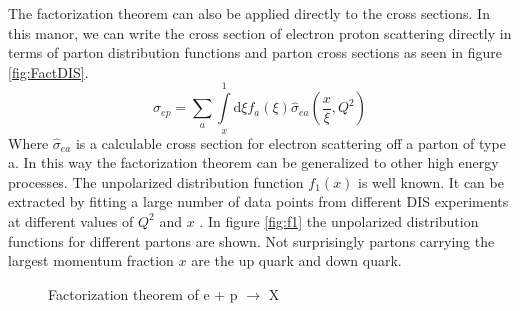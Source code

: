 \documentclass[abstract = on,listof=totoc, bibliography=totoc]{scrreprt}
\begin{document}
The factorization theorem can also be applied directly to the cross sections. In this manor, we can write the cross section of electron proton scattering directly in terms of parton distribution functions and parton cross sections as seen in figure \ref{fig:FactDIS}.
\begin{equation}
\sigma_{ep} = \sum\limits_a \int\limits_x^1 \text{d}\xi f_a(\xi) \hat{\sigma}_{ea}\left(\frac{x}{\xi},Q^2\right)
\end{equation}
Where $\hat{\sigma}_{ea}$ is a calculable cross section for electron scattering off a parton of type a. In this way the factorization theorem can be generalized to other high energy processes.\cite{factorization}
The unpolarized distribution function $f_1(x)$ is well known. It can be extracted by fitting a large number of data points from different DIS experiments at different values of $Q^2$ and $x$ \cite{unpolDisFuncPic}. In figure \ref{fig:f1} the unpolarized distribution functions for different partons are shown. Not surprisingly partons carrying the largest momentum fraction $x$ are the up quark and down quark. 
\begin{figure}[!tbp]
  \centering
  \hfill
  \caption{Factorization theorem of e + p $\rightarrow$ X}
\end{figure}
\end{document}
